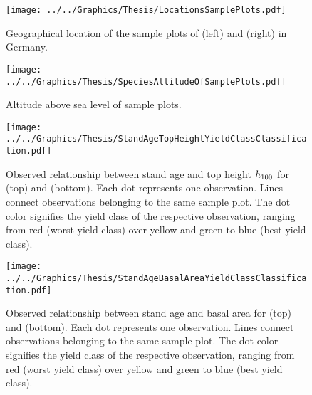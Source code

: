 \begin{figure}[H]
  \centering
  \texttt{[image: ../../Graphics/Thesis/LocationsSamplePlots.pdf]}
  \caption{Geographical location of the sample plots of \Beech{} (left) and \Spruce{} (right) in Germany.}
  \label{fig:LocationsSamplePlots}
\end{figure}

\begin{figure}[H]
  \centering
  \texttt{[image: ../../Graphics/Thesis/SpeciesAltitudeOfSamplePlots.pdf]}
  \caption{Altitude above sea level of sample plots.}
  \label{fig:AltitudeSamplePlots}
\end{figure}

\newpage{}
\begin{figure}[H]
  \centering
  \texttt{[image: ../../Graphics/Thesis/StandAgeTopHeightYieldClassClassification.pdf]}
  \caption{Observed relationship between stand age and top height \(h_{100}\) for \Beech{} (top) and \Spruce{} (bottom).  Each dot represents one observation.  Lines connect observations belonging to the same sample plot.  The dot color signifies the yield class of the respective observation, ranging from red (worst yield class) over yellow and green to blue (best yield class).}
  \label{fig:TrainingDataYieldClassClassification}
\end{figure}

\newpage{}
\begin{figure}[H]
  \centering
  \texttt{[image: ../../Graphics/Thesis/StandAgeBasalAreaYieldClassClassification.pdf]}
  \caption{Observed relationship between stand age and basal area for \Beech{} (top) and \Spruce{} (bottom).  Each dot represents one observation.  Lines connect observations belonging to the same sample plot.  The dot color signifies the yield class of the respective observation, ranging from red (worst yield class) over yellow and green to blue (best yield class).}
  \label{fig:TrainingDataYieldClassClassification}
\end{figure}


